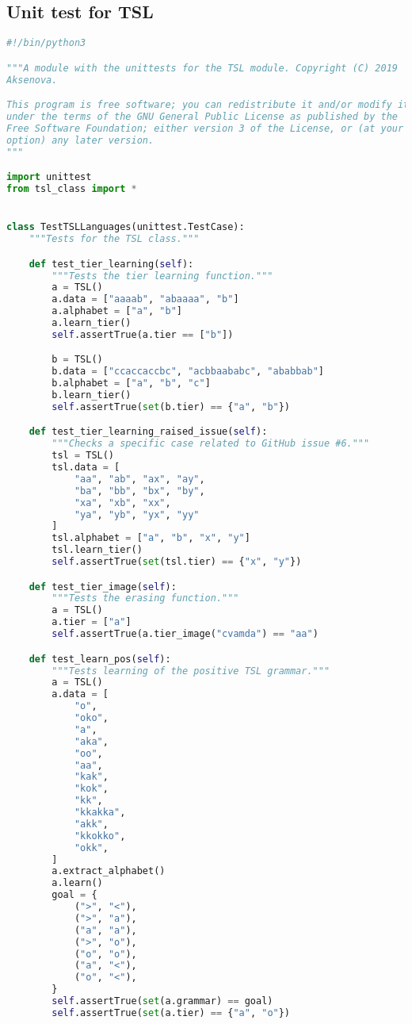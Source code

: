\subsection*{Unit test for TSL}

\begin{lstlisting}[language=Python]
#!/bin/python3

"""A module with the unittests for the TSL module. Copyright (C) 2019  Alena
Aksenova.

This program is free software; you can redistribute it and/or modify it
under the terms of the GNU General Public License as published by the
Free Software Foundation; either version 3 of the License, or (at your
option) any later version.
"""

import unittest
from tsl_class import *


class TestTSLLanguages(unittest.TestCase):
    """Tests for the TSL class."""

    def test_tier_learning(self):
        """Tests the tier learning function."""
        a = TSL()
        a.data = ["aaaab", "abaaaa", "b"]
        a.alphabet = ["a", "b"]
        a.learn_tier()
        self.assertTrue(a.tier == ["b"])

        b = TSL()
        b.data = ["ccaccaccbc", "acbbaababc", "ababbab"]
        b.alphabet = ["a", "b", "c"]
        b.learn_tier()
        self.assertTrue(set(b.tier) == {"a", "b"})

    def test_tier_learning_raised_issue(self):
        """Checks a specific case related to GitHub issue #6."""
        tsl = TSL()
        tsl.data = [
            "aa", "ab", "ax", "ay", 
            "ba", "bb", "bx", "by", 
            "xa", "xb", "xx", 
            "ya", "yb", "yx", "yy"
        ]
        tsl.alphabet = ["a", "b", "x", "y"]
        tsl.learn_tier()
        self.assertTrue(set(tsl.tier) == {"x", "y"})

    def test_tier_image(self):
        """Tests the erasing function."""
        a = TSL()
        a.tier = ["a"]
        self.assertTrue(a.tier_image("cvamda") == "aa")

    def test_learn_pos(self):
        """Tests learning of the positive TSL grammar."""
        a = TSL()
        a.data = [
            "o",
            "oko",
            "a",
            "aka",
            "oo",
            "aa",
            "kak",
            "kok",
            "kk",
            "kkakka",
            "akk",
            "kkokko",
            "okk",
        ]
        a.extract_alphabet()
        a.learn()
        goal = {
            (">", "<"),
            (">", "a"),
            ("a", "a"),
            (">", "o"),
            ("o", "o"),
            ("a", "<"),
            ("o", "<"),
        }
        self.assertTrue(set(a.grammar) == goal)
        self.assertTrue(set(a.tier) == {"a", "o"})


\end{lstlisting}
